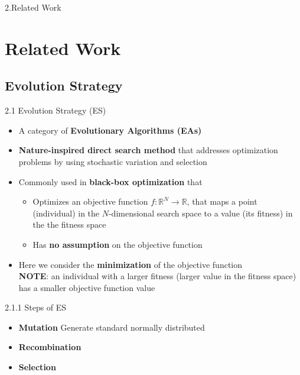 \documentclass{beamer}
\begin{document}
\begin{frame}[plain,c]
\begin{center}
\Huge 2.Related Work
\end{center}
\end{frame}
\section{Related Work}


\subsection{Evolution Strategy}
\begin{frame}{2.1 Evolution Strategy (ES)}
\begin{itemize}
    \item A category of \textbf{Evolutionary Algorithms (EAs)}
    \item \textbf{Nature-inspired direct search method} that addresses optimization problems by using stochastic variation and selection 
    \item Commonly used in \textbf{black-box optimization} that
    \begin{itemize}
        \item Optimizes an objective function $f:\mathbb{R}^N \rightarrow \mathbb{R}$, that maps a point (individual) in the $N$-dimensional search space to a value (its fitness) in the the fitness space
        \item Has \textbf{no assumption} on the objective function
    \end{itemize}
    \item  Here we consider the \textbf{minimization} of the objective function  \\
    \textbf{NOTE}: an individual with a larger fitness (larger value in the fitness space) has a smaller objective function value

    
\end{itemize}
\end{frame}

\begin{frame}{2.1.1 Steps of ES}
\begin{itemize}
    \item \textbf{Mutation}  
    Generate standard normally distributed 
    \item \textbf{Recombination}
    
    \item \textbf{Selection} 
\end{itemize}
\end{frame}
\end{document}
